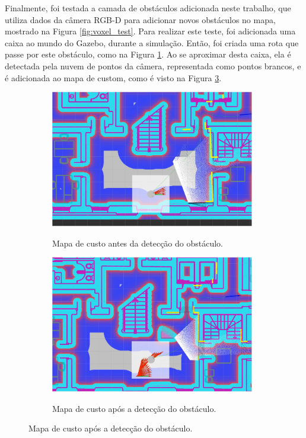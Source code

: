 \documentclass[repeatfields,xlists,xpacks,oneside,yearsonly]{ufrgscca}
\begin{document}
Finalmente, foi testada a camada de obstáculos adicionada neste
trabalho, que utiliza dados da câmera RGB-D para adicionar novos
obstáculos no mapa, mostrado na Figura \ref{fig:voxel_test}. Para
realizar este teste, foi adicionada uma caixa ao mundo do Gazebo,
durante a simulação. Então, foi criada uma rota que passe por este
obstáculo, como na Figura \ref{fig:voxel_before}. Ao se aproximar
desta caixa, ela é detectada pela nuvem de pontos da câmera,
representada como pontos brancos, e é adicionada ao mapa de custom,
como é visto na Figura \ref{fig:voxel_after}.

\begin{figure}[h]
    \caption{Mapeamento de obstáculos da camada \textit{voxel}}
    \label{fig:voxel_test}
    \begin{subfigure}{0.5\linewidth}
        {
            \centering
            \caption{Mapa de custo antes da detecção do obstáculo.}
            \label{fig:voxel_before}
            \includegraphics[width=0.98\textwidth]{costmap_voxel_before.png}\\
        }
    \end{subfigure}
    \begin{subfigure}{0.5\linewidth}
        {
            \centering
            \caption{Mapa de custo após a detecção do obstáculo.}
            \label{fig:voxel_after}
            \includegraphics[width=0.98\textwidth]{costmap_voxel_after.png}\\
        }
    \end{subfigure}
\end{figure}
\end{document}
